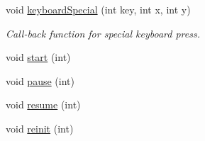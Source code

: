 \begin{DoxyCompactItemize}
void \hyperlink{classSimulation_ac60b25961b18057239efcb610b5c679f}{keyboard\-Special} (int key, int x, int y)
\begin{DoxyCompactList}\small\item\em Call-\/back function for special keyboard press. \end{DoxyCompactList}\item 
void \hyperlink{classSimulation_adaf59b9b5a544f6214d636632a16d6d4}{start} (int)
\item 
void \hyperlink{classSimulation_a72676ce712a367d4124bf88f4165b7b7}{pause} (int)
\item 
void \hyperlink{classSimulation_aecfee72e6cd12d7b2a847a9c9b0634ec}{resume} (int)
\item 
void \hyperlink{classSimulation_a1e61cb809f6d69ea98b6b5296e95036b}{reinit} (int)
\end{DoxyCompactItemize}
